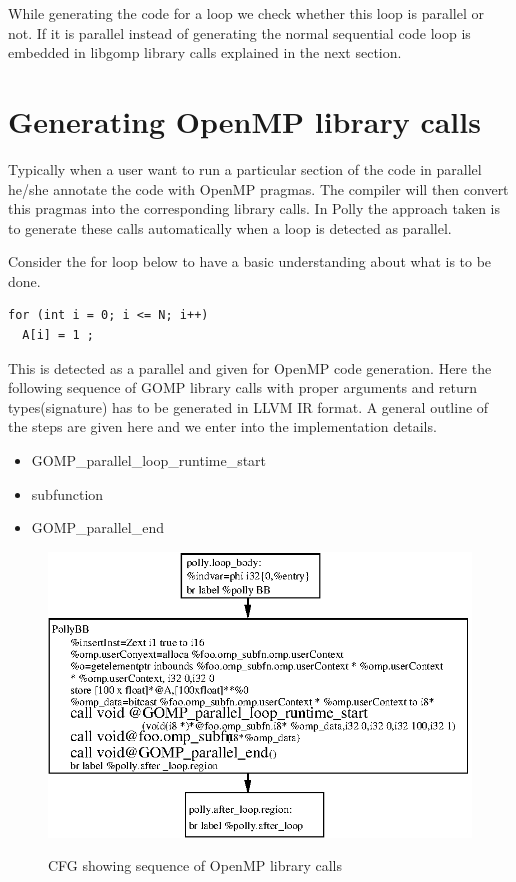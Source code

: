 While generating the code for a loop we check whether this loop is parallel or not. If it is
parallel instead of generating the normal sequential code  loop is embedded in
libgomp library calls explained in the next section.
\section{Generating OpenMP library calls}

Typically when a user want to run a particular section of the code in parallel he/she annotate the code with
OpenMP pragmas. The compiler will then convert this pragmas into the corresponding library calls. In Polly the
approach taken is to generate these calls automatically when a loop is detected as parallel.

Consider the for loop below to have a basic understanding about what is to be done.
{\footnotesize
\begin{lstlisting}
for (int i = 0; i <= N; i++)
  A[i] = 1 ;
\end{lstlisting}
}
This is detected as a parallel and given for OpenMP code generation. Here the following
sequence of GOMP library calls with proper arguments and return types(signature) has to be generated in
LLVM IR format. A general outline of the steps are given here and we enter into the implementation details.

\begin{itemize}
\item GOMP\_parallel\_loop\_runtime\_start
\item subfunction
\item GOMP\_parallel\_end
\end{itemize}

\begin{figure}
\begin{center}
  \label{fig:openmp_cfg}
  \includegraphics[width=14cm]{images/ompcalls.eps}
  \caption{CFG showing sequence of OpenMP library calls}
\end{center}
\end{figure}

